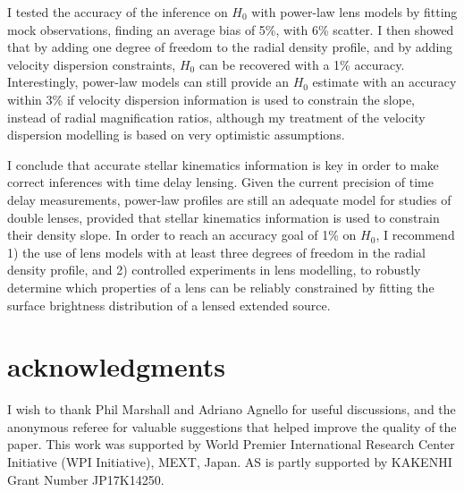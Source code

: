 \documentclass[usenatbib]{mnras}
\begin{document}
I tested the accuracy of the inference on $H_0$ with power-law lens models by fitting mock observations, finding an average bias of 5\%, with 6\% scatter.
I then showed that by adding one degree of freedom to the radial density profile, and by adding velocity dispersion constraints, $H_0$ can be recovered with a 1\% accuracy.
Interestingly, power-law models can still provide an $H_0$ estimate with an accuracy within 3\% if velocity dispersion information is used to constrain the slope, instead of radial magnification ratios, although my treatment of the velocity dispersion modelling is based on very optimistic assumptions.

I conclude that accurate stellar kinematics information is key in order to make correct inferences with time delay lensing. Given the current precision of time delay measurements, power-law profiles are still an adequate model for studies of double lenses, provided that stellar kinematics information is used to constrain their density slope.
In order to reach an accuracy goal of 1\% on $H_0$, I recommend 1) the use of lens models with at least three degrees of freedom in the radial density profile, and 
2) controlled experiments in lens modelling, to robustly determine which properties of a lens can be reliably constrained by fitting the surface brightness distribution of a lensed extended source.

\section*{acknowledgments}
I wish to thank Phil Marshall and Adriano Agnello for useful discussions, and the anonymous referee for valuable suggestions that helped improve the quality of the paper.
This work was supported by World Premier International Research Center Initiative (WPI Initiative), MEXT, Japan.
AS is partly supported by KAKENHI Grant Number JP17K14250. 



\appendix
\onecolumn
\end{document}
